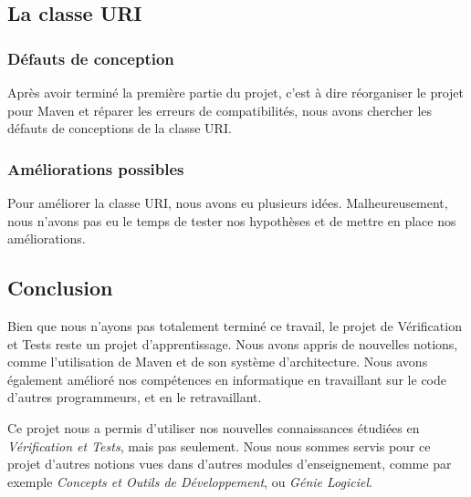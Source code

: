 \documentclass[a4paper]{article}
\begin{document}
		\subsection{La classe URI}

		\vspace{0.5cm}

			\subsubsection{Défauts de conception}

			Après avoir terminé la première partie du projet, c'est à dire réorganiser le projet pour Maven et réparer les erreurs de compatibilités, nous avons chercher les défauts de conceptions de la classe URI.  

			\vspace{0.5cm}

			\subsubsection{Améliorations possibles}

			Pour améliorer la classe URI, nous avons eu plusieurs idées. Malheureusement, nous n'avons pas eu le temps de tester nos hypothèses et de mettre en place nos améliorations.

			\newpage

	\begin{center}
		\section{Conclusion}
	\end{center}	
		Bien que nous n'ayons pas totalement terminé ce travail, le projet de Vérification et Tests reste un projet d'apprentissage. Nous avons appris de nouvelles notions, comme l'utilisation de Maven et de son système d'architecture. Nous avons également amélioré nos compétences en informatique en travaillant sur le code d'autres programmeurs, et en le retravaillant.

		Ce projet nous a permis d'utiliser nos nouvelles connaissances étudiées en \textit{Vérification et Tests}, mais pas seulement. Nous nous sommes servis pour ce projet d'autres notions vues dans d'autres modules d'enseignement, comme par exemple \textit{Concepts et Outils de Développement}, ou \textit{Génie Logiciel}.
 
\end{document}
